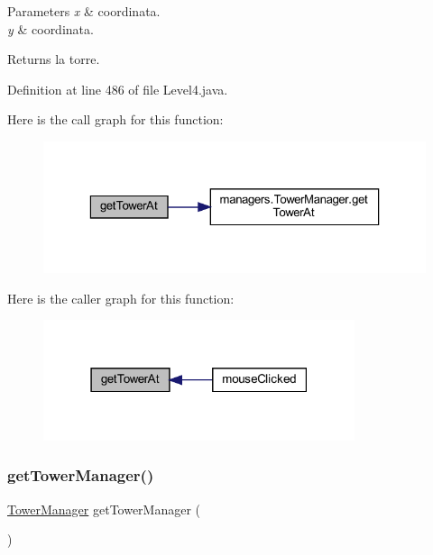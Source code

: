 \begin{DoxyParams}{Parameters}
{\em x} & coordinata. \\
\hline
{\em y} & coordinata.\\
\hline
\end{DoxyParams}
\begin{DoxyReturn}{Returns}
la torre. 
\end{DoxyReturn}


Definition at line 486 of file Level4.\+java.

Here is the call graph for this function\+:
\nopagebreak
\begin{figure}[H]
\begin{center}
\leavevmode
\includegraphics[width=323pt]{classscenes_1_1_level4_a4345f2e80059788e5ab1dd1cf0ff2c04_cgraph}
\end{center}
\end{figure}
Here is the caller graph for this function\+:\nopagebreak
\begin{figure}[H]
\begin{center}
\leavevmode
\includegraphics[width=259pt]{classscenes_1_1_level4_a4345f2e80059788e5ab1dd1cf0ff2c04_icgraph}
\end{center}
\end{figure}
\mbox{\label{classscenes_1_1_level4_a6fff8a01141127e3c2897a077e5dee92}} 
\subsubsection{\texorpdfstring{get\+Tower\+Manager()}{getTowerManager()}}
{\footnotesize\ttfamily \hyperlink{classmanagers_1_1_tower_manager}{Tower\+Manager} get\+Tower\+Manager (\begin{DoxyParamCaption}{ }\end{DoxyParamCaption})}



